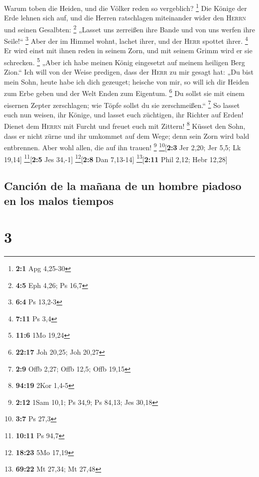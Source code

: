  Warum toben die Heiden, und die Völker reden so
vergeblich? \footnote{\textbf{2:1} Apg 4,25-30}  Die
Könige der Erde lehnen sich auf, und die Herren ratschlagen miteinander
wider den \textsc{Herrn} und seinen Gesalbten: \footnote{\textbf{4:5}
  Eph 4,26; Ps 16,7}  „Lasset uns zerreißen ihre Bande und
von uns werfen ihre Seile!{}`` \footnote{\textbf{6:4} Ps 13,2-3}
 Aber der im Himmel wohnt, lachet ihrer, und der
\textsc{Herr} spottet ihrer. \footnote{\textbf{7:11} Ps 3,4}
 Er wird einst mit ihnen reden in seinem Zorn, und mit
seinem Grimm wird er sie schrecken. \footnote{\textbf{11:6} 1Mo 19,24}
 „Aber ich habe meinen König eingesetzt auf meinem
heiligen Berg Zion.``  Ich will von der Weise predigen,
dass der \textsc{Herr} zu mir gesagt hat: „Du bist mein Sohn, heute habe
ich dich gezeuget;  heische von mir, so will ich dir
Heiden zum Erbe geben und der Welt Enden zum Eigentum. \footnote{\textbf{22:17}
  Joh 20,25; Joh 20,27}  Du sollst sie mit einem eisernen
Zepter zerschlagen; wie Töpfe sollst du sie zerschmeißen.`` \footnote{\textbf{2:9}
  Offb 2,27; Offb 12,5; Offb 19,15}  So lasset euch nun
weisen, ihr Könige, und lasset euch züchtigen, ihr Richter auf Erden!
 Dienet dem \textsc{Herrn} mit Furcht und freuet euch mit
Zittern! \footnote{\textbf{94:19} 2Kor 1,4-5}  Küsset den
Sohn, dass er nicht zürne und ihr umkommet auf dem Wege; denn sein Zorn
wird bald entbrennen. Aber wohl allen, die auf ihn trauen! \footnote{\textbf{2:12}
  1Sam 10,1; Ps 34,9; Ps 84,13; Jes 30,18} \footnote{\textbf{3:7} Ps
  27,3}{[}\textbf{2:3} Jer 2,20; Jer 5,5; Lk 19,14{]}
\footnote{\textbf{10:11} Ps 94,7}{[}\textbf{2:5} Jes 34,-1{]}
\footnote{\textbf{18:23} 5Mo 17,19}{[}\textbf{2:8} Dan 7,13-14{]}
\footnote{\textbf{69:22} Mt 27,34; Mt 27,48}{[}\textbf{2:11} Phil 2,12;
Hebr 12,28{]}

\hypertarget{canciuxf3n-de-la-mauxf1ana-de-un-hombre-piadoso-en-los-malos-tiempos}{%
\subsection{Canción de la mañana de un hombre piadoso en los malos
tiempos}\label{canciuxf3n-de-la-mauxf1ana-de-un-hombre-piadoso-en-los-malos-tiempos}}

\hypertarget{section-2}{%
\section{3}\label{section-2}}

